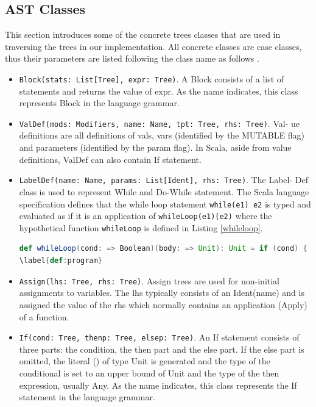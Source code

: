 \subsection{AST Classes}
This section introduces some of the concrete trees classes that are used in traversing the trees in our implementation. All concrete classes are case classes, thus their parameters are listed following the class name as follows \cite{stocker2010scala}. 
\begin{itemize}
\item \texttt{Block(stats: List[Tree], expr: Tree)}. A Block consists of a list of statements and returns the value of expr. As the name indicates, this class represents Block in the language grammar. 
\item \texttt{ValDef(mods: Modifiers, name: Name, tpt: Tree, rhs: Tree)}. Val- ue definitions are all definitions of vals, vars (identified by the MUTABLE flag) and parameters (identified by the param flag). In Scala, aside from value definitions, ValDef can also contain If statement. 
\item \texttt{LabelDef(name: Name, params: List[Ident], rhs: Tree)}. The Label- Def class is used to represent While and Do-While statement. The Scala language specification \cite{odersky2004scala} defines that the while loop statement \texttt{while(e1) e2} is typed and evaluated as if it is an application of \texttt{whileLoop(e1)(e2)} where the hypothetical function \texttt{whileLoop} is defined in Listing \ref{whileloop}. 
\begin{lstlisting}[language=scala,caption=WhileLoop Function, label = whileloop]
def whileLoop(cond: => Boolean)(body: => Unit): Unit = if (cond) { body ; whileLoop(cond)(body) } else {}
\label{def:program}
\end{lstlisting}
\item \texttt{Assign(lhs: Tree, rhs: Tree)}. Assign trees are used for non-initial assignments to variables. The lhs typically consists of an Ident(name) and is assigned the value of the rhs which normally contains an application (Apply) of a function. 
\item \texttt{If(cond: Tree, thenp: Tree, elsep: Tree)}. An If statement consists of three parts: the condition, the then part and the else part. If the else part is omitted, the literal () of type Unit is generated and the type of the conditional is set to an upper bound of Unit and the type of the then expression, usually Any. As the name indicates, this class represents the If statement in the language grammar. 
\end{itemize}

